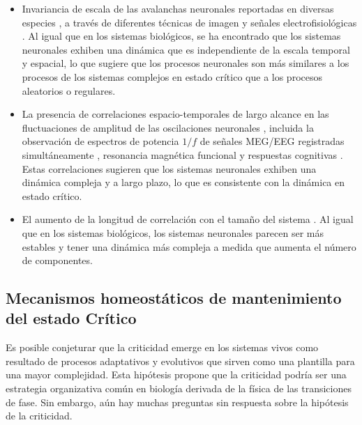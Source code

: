 \begin{itemize}
\item Invariancia de escala de las avalanchas neuronales \cite{fontenele_criticality_2019,beggs_neuronal_2003,beggs_neuronal_2004}  reportadas en diversas especies \cite{hahn_neuronal_2010,petermann_spontaneous_2009,shriki_neuronal_2013}, a través de diferentes técnicas de imagen \cite{tagliazucchi_criticality_2012} y señales electrofisiológicas \cite{linkenkaer-hansen_long-range_2001}. Al igual que en los sistemas biológicos, se ha encontrado que los sistemas neuronales exhiben una dinámica que es independiente de la escala temporal y espacial, lo que sugiere que los procesos neuronales son más similares a los procesos de los sistemas complejos en estado crítico que a los procesos aleatorios o regulares.
\item La presencia de correlaciones espacio-temporales de largo alcance en las fluctuaciones de amplitud de las oscilaciones neuronales \cite{expert_self-similar_2010,fraiman_what_2012,kitzbichler_broadband_2009}, incluida la observación de espectros de potencia $1/f$ de señales \acrshort{MEG}/\acrshort{EEG} registradas simultáneamente \cite{linkenkaer-hansen_long-range_2001}, resonancia magnética funcional  \cite{kitzbichler_broadband_2009} y respuestas cognitivas  \cite{van_orden_human_2005,shew_adaptation_2015}. Estas correlaciones sugieren que los sistemas neuronales exhiben una dinámica compleja y a largo plazo, lo que es consistente con la dinámica en estado crítico.
\item El aumento de la longitud de correlación con el tamaño del sistema \cite{fraiman_what_2012,ribeiro_trial-by-trial_2022,haimovici_brain_2013}. Al igual que en los sistemas biológicos, los sistemas neuronales parecen ser más estables y tener una dinámica más compleja a medida que aumenta el número de componentes.
\end{itemize}




\subsection{Mecanismos homeostáticos de mantenimiento  del estado Crítico}

Es posible conjeturar que la criticidad emerge en los sistemas vivos como resultado de procesos adaptativos y evolutivos que sirven como una plantilla para una mayor complejidad. Esta hipótesis propone que la criticidad podría ser una estrategia organizativa común en biología derivada de la física de las transiciones de fase. Sin embargo, aún hay muchas preguntas sin respuesta sobre la hipótesis de la criticidad.\\

